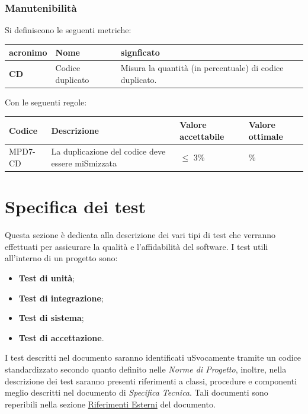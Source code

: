 \subsubsection{Manutenibilità}
Si definiscono le seguenti metriche:
\begin{table}[h!]
\centering
\def\arraystretch{1.5}
\begin{tabular}{ |m{2cm}|m{5.5cm}|m{6.5cm}| }
\hline
\rowcolor{lightgray!30}
\textbf{acronimo} & \textbf{Nome} & \textbf{signficato}\\
\hline
\textbf{CD} & Codice duplicato & Misura la quantità (in percentuale) di codice duplicato.\\
\hline
\end{tabular}
\end{table}
\par Con le seguenti regole:
\begin{table}[h!]
\centering
\def\arraystretch{1.5}
\begin{tabular}{ |>{\centering\arraybackslash}m{2.5cm}|>{\centering\arraybackslash}m{5.5cm}|>{\centering\arraybackslash}m{3cm}|>{\centering\arraybackslash}m{3cm}| }
\hline
\rowcolor{black}
\textbf{\color{white} Codice} & \textbf{\color{white} Descrizione} & \textbf{\color{white} Valore accettabile} & \textbf{\color{white} Valore ottimale}\\
\hline
MPD7-CD & La duplicazione del codice deve essere miSmizzata & $\leq$ 3\% & 0\% \\
\hline
\end{tabular}
\end{table}

\newpage
\section{Specifica dei test}\label{sec:test}
\par Questa sezione è dedicata alla descrizione dei vari tipi di test che verranno effettuati per assicurare la qualità e l'affidabilità del software.
I test utili all’interno di un progetto sono:
\begin{itemize}
    \item \textbf{Test di unità};
    \item \textbf{Test di integrazione};
    \item \textbf{Test di sistema};
    \item \textbf{Test di accettazione}.
\end{itemize}
I test descritti nel documento saranno identificati uSvocamente tramite un codice standardizzato secondo quanto definito nelle \textit{Norme di Progetto}, inoltre, nella descrizione dei test saranno presenti riferimenti a classi, procedure e componenti meglio descritti nel documento di \textit{Specifica Tecnica}.
Tali documenti sono reperibili nella sezione \hyperref[sec:riferimenti_esterni]{Riferimenti Esterni} del documento.


